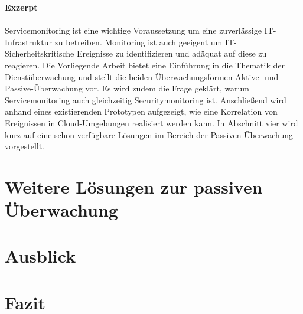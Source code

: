\documentclass[a4paper,10pt]{scrreprt}
\begin{document}
\vspace*{\fill}
\textbf{Exzerpt}\\\\
    Servicemonitoring ist eine wichtige Voraussetzung um eine zuverlässige 
    IT-Infrastruktur zu betreiben. Monitoring ist auch geeigent um IT-Sicherheitskritische
    Ereignisse zu identifizieren und adäquat auf diese zu reagieren. Die Vorliegende
    Arbeit bietet eine Einführung in die Thematik der Dienstüberwachung und stellt die
    beiden Überwachungsformen Aktive- und Passive-Überwachung vor. Es wird zudem
    die Frage geklärt, warum Servicemonitoring auch gleichzeitig Securitymonitoring ist.
    Anschließend wird
    anhand eines existierenden Prototypen aufgezeigt, wie eine Korrelation von 
    Ereignissen in Cloud-Umgebungen realisiert werden kann. In Abschnitt vier wird
    kurz auf eine schon verfügbare Lösungen im Bereich der Passiven-Überwachung 
    vorgestellt. 
\vspace*{\fill}


\tableofcontents
\thispagestyle{fancy}


\cleardoubleemptypage


\chapter{Weitere Lösungen zur passiven Überwachung}\label{elk}
\thispagestyle{fancy}

\chapter{Ausblick}
\thispagestyle{fancy}

\chapter{Fazit}
\thispagestyle{fancy}


{}

\thispagestyle{fancy}

\listoffigures
\begingroup
\let\clearpage\relax
\listoftables
\endgroup
\thispagestyle{fancy}
\end{document}
